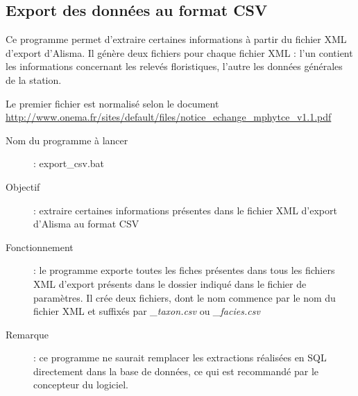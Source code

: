 \subsection{Export des données au format CSV}
Ce programme permet d'extraire certaines informations à partir du fichier XML d'export d'Alisma. Il génère deux fichiers pour chaque fichier XML : l'un contient les informations concernant les relevés floristiques, l'autre les données générales de la station.

Le premier fichier est normalisé selon le document \url{ http://www.onema.fr/sites/default/files/notice_echange_mphytce_v1.1.pdf}

\begin{description}
\item[Nom du programme à lancer] : export\_csv.bat
\item [Objectif] : extraire certaines informations présentes dans le fichier XML d'export d'Alisma au format CSV
\item [Fonctionnement] : le programme exporte toutes les fiches présentes dans tous les fichiers XML d'export présents dans le dossier indiqué dans le fichier de paramètres. Il crée deux fichiers, dont le nom commence par le nom du fichier XML et suffixés par \textit{\_taxon.csv} ou \textit{\_facies.csv}
\item [Remarque] : ce programme ne saurait remplacer les extractions réalisées en SQL directement dans la base de données, ce qui est recommandé par le concepteur du logiciel.
\end{description}

